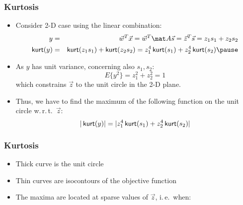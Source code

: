 \begin{frame}
  \frametitle{Kurtosis \cont}

  \begin{itemize}
    \item Consider 2-D case using the linear combination:
      \begin{eqnarray*}
        y        &=& \vec w^T \vec x = \vec w^T \mat A \vec s = \vec z^T \vec s = z_1 s_1 + z_2 s_2 \\
        \kurt(y) &=& \kurt(z_1 s_1) + \kurt(z_2 s_2) = z_1^4 \kurt(s_1) + z_2^4 \kurt(s_2) \pause
      \end{eqnarray*}
    \item As $y$ has unit variance, concerning also $s_1, s_2$:
      \begin{displaymath}
        E\{ y^2 \} = z_1^2 + z_2^2 = 1
      \end{displaymath}
      which constrains $\vec z$ to the unit circle in the 2-D plane. \\[.25cm] \pause
    \item Thus, we have to find the maximum of the following function on the unit circle w.\,r.\,t.\ $\vec z$:
      \begin{displaymath}
        | \mathop{\mathsf{kurt}}(y) | = | z_1^4 \mathop{\mathsf{kurt}}(s_1) + z_2^4 \mathop{\mathsf{kurt}}(s_2) |
      \end{displaymath}
  \end{itemize}
\end{frame}


\begin{frame}
  \frametitle{Kurtosis}


  \begin{center}
    \resizebox{.4\linewidth}{!}{     
      
    }
  \end{center}
  
  \begin{itemize}
    \item Thick curve is the unit circle
    \item Thin curves are isocontours of the objective function \pause
    \item The maxima are located at sparse values of $\vec z$, i.\,e.\ when:
      \begin{center}
      \end{center}
  \end{itemize}
\end{frame}


